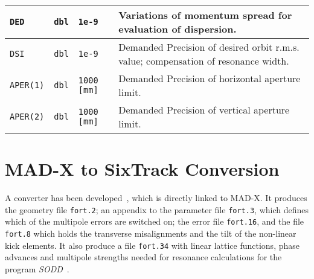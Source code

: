 \begin{table}[h]
\begin{tabular}{|l|l|l|>{\raggedright\arraybackslash}p{10.2cm}|}
        \hline
        \texttt{DED} & \texttt{dbl} & \texttt{1e-9} & Variations of momentum spread for evaluation of dispersion. \\
        \hline
        \texttt{DSI} & \texttt{dbl} & \texttt{1e-9} & Demanded Precision of desired orbit r.m.s. value; compensation of resonance width. \\
        \hline
        \texttt{APER(1)} & \texttt{dbl} & \texttt{1000 [mm]} & Demanded Precision of horizontal aperture limit. \\
        \hline
        \texttt{APER(2)} & \texttt{dbl} & \texttt{1000 [mm]} & Demanded Precision of vertical aperture limit. \\
        \hline
    \end{tabular}
\end{table}

\section{MAD-X to SixTrack Conversion} \label{MADT}

A converter has been developed~\cite{CONVERTOR}, which is directly linked to MAD-X\@.
It produces the geometry file \texttt{fort.2}; an appendix to the parameter file \texttt{fort.3}, which defines which of the multipole errors are switched on; the error file \texttt{fort.16}, and the file \texttt{fort.8} which holds the transverse misalignments and the tilt of the non-linear kick elements.
It also produce a file \texttt{fort.34} with linear lattice functions, phase advances and multipole strengths needed for resonance calculations for the program \textit{SODD}~\cite{SODD}.





